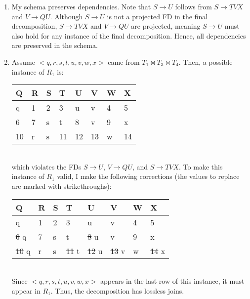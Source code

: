 \documentclass{article}
\begin{document}
\begin{enumerate}
{\begin{enumerate}[itemsep=0.3cm]
In summary, the relations in the final decomposition and their corresponding projected FDs are: $T_1(Q,U,V)$ with FD $V \to QU$, $T_3(S,T,V,X)$ with FD $S \to TVX$, and $T_4(R,S,W)$ with FD $R \to SW$.
\item My schema preserves dependencies. Note that $S \to U$ follows from $S \to TVX$ and $V \to QU$. Although $S \to U$ is not a projected FD in the final decomposition, $S \to TVX$ and $V \to QU$ are projected, meaning $S \to U$ must also hold for any instance of the final decomposition. Hence, all dependencies are preserved in the schema.

\item Assume $<q,r,s,t,u,v,w,x>$ came from $T_1 \bowtie T_3 \bowtie T_4$. Then, a possible instance of $R_1$ is:\\

\begin{minipage}[t]{1in}\begin{tabular}{llllllll}
Q & R & S & T & U & V & W & X\\
\hline
q & 1 & 2 & 3 & u & v & 4 & 5\\
6 & 7 & s & t & 8 & v & 9 & x\\
10 & r & s & 11 & 12 & 13 & w & 14\\
\end{tabular}\end{minipage}\\

which violates the FDs $S \to U$, $V \to QU$, and $S \to TVX$. To make this instance of $R_1$ valid, I make the following corrections (the values to replace are marked with strikethroughs):\\

\begin{minipage}[t]{1in}\begin{tabular}{llllllll}
Q & R & S & T & U & V & W & X\\
\hline
q & 1 & 2 & 3 & u & v & 4 & 5\\
\sout{6} q & 7 & s & t & \sout{8} u & v & 9 & x\\
\sout{10} q & r & s & \sout{11} t & \sout{12} u & \sout{13} v & w & \sout{14} x\\
\end{tabular}\end{minipage}\\

Since $<q,r,s,t,u,v,w,x>$ appears in the last row of this instance, it must appear in $R_1$. Thus, the decomposition has lossless joins.
\end{enumerate}

}
\end{enumerate}
\end{document}
